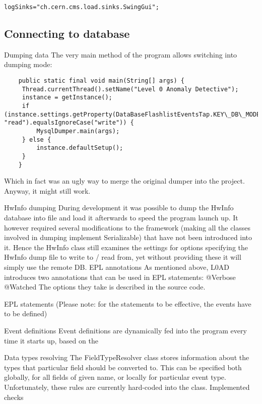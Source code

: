 \texttt{logSinks="ch.cern.cms.load.sinks.SwingGui";}


\subsection{Connecting to database}

Dumping data
The very main method of the program allows switching into dumping mode:

\begin{lstlisting}
	public static final void main(String[] args) {
   	 Thread.currentThread().setName("Level 0 Anomaly Detective");
   	 instance = getInstance();
   	 if (instance.settings.getProperty(DataBaseFlashlistEventsTap.KEY\_DB\_MODE, "read").equalsIgnoreCase("write")) {
   		 MysqlDumper.main(args);
   	 } else {
   		 instance.defaultSetup();
   	 }
    }
\end{lstlisting}

Which in fact was an ugly way to merge the original dumper into the project. Anyway, it might still work.

HwInfo dumping
During development it was possible to dump the HwInfo database into file and load it afterwards to speed the program launch up. It however required several modifications to the framework (making all the classes involved in dumping implement Serializable) that have not been introduced into it. Hence the HwInfo class still examines the settings for options specifying the HwInfo dump file to write to / read from, yet without providing these it will simply use the remote DB.
EPL annotations
As mentioned above, L0AD introduces two annotations that can be used in EPL statements:
@Verbose
@Watched
The options they take is described in the source code.

EPL statements
(Please note: for the statements to be effective, the events have to be defined)

Event definitions
Event definitions are dynamically fed into the program every time it starts up, based on the 

Data types resolving
The FieldTypeResolver class stores information about the types that particular field should be converted to. This can be specified both globally, for all fields of given name, or locally for particular event type. Unfortunately, these rules are currently hard-coded into the class.
Implemented checks



